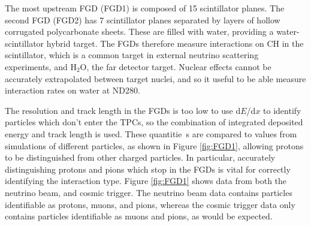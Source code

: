 The most upstream FGD (FGD1) is composed of 15 scintillator planes. The second FGD (FGD2) has 7 scintillator planes separated by layers of hollow corrugated polycarbonate sheets. These are filled with water, providing a water-scintillator hybrid target. The FGDs therefore measure interactions on CH in the scintillator, which is a common target in external neutrino scattering experiments, and H$_2$O, the far detector target. Nuclear effects cannot be accurately extrapolated between target nuclei, and so it useful to be able measure interaction rates on water at ND280.

The resolution and track length in the FGDs is too low to use d$E$/d$x$ to identify particles which don't enter the TPCs, so the combination of integrated deposited energy and track length is used. These quantitie\
s are compared to values from simulations of different particles, as shown in Figure \ref{fig:FGD1}, allowing protons to be distinguished from other charged particles. In particular, accurately distinguishing protons and pions which stop in the FGDs is vital for correctly identifying the interaction type. Figure \ref{fig:FGD1} shows data from both the neutrino beam, and cosmic trigger. The neutrino beam data contains particles identifiable as protons, muons, and pions, whereas the cosmic trigger data only contains particles identifiable as muons and pions, as would be expected.

